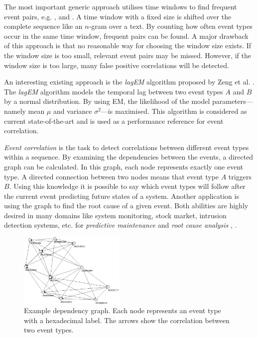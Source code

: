 \documentclass[conference]{IEEEtran}
\theoremstyle{examplestyle}
\begin{document}
The most important generic approach utilises time windows to find frequent event pairs, e.g. \cite{Jakobson1993}, \cite{Mannila1997} and \cite{Bouandas2007}. A time window with a fixed size is shifted over the complete sequence like an \(n\)-gram over a text. By counting how often event types occur in the same time window, frequent pairs can be found. A major drawback of this approach is that no reasonable way for choosing the window size exists. If the window size is too small, relevant event pairs may be missed. However, if the window size is too large, many false positive correlations will be detected.


An interesting existing approach is the \textit{lagEM} algorithm proposed by Zeng et al. \cite{Zeng2015}. The \textit{lagEM} algorithm models the temporal lag between two event types \(A\) and \(B\) by a normal distribution. By using \ac{EM}, the likelihood of the model parameters---namely mean \(\mu\) and variance \(\sigma^2\)---is maximised. This algorithm is considered as current state-of-the-art and is used as a performance reference for event correlation.




\textit{Event correlation} is the task to detect correlations between different event types within a sequence. By examining the dependencies between the events, a directed graph can be calculated. In this graph, each node represents exactly one event type. A directed connection between two nodes means that event type \(A\) triggers \(B\). Using this knowledge it is possible to say which event types will follow after the current event predicting future states of a system. Another application is using the graph to find the root cause of a given event. Both abilities are highly desired in many domains like system monitoring, stock market, intrusion detection systems, etc. for \textit{predictive maintenance} and \textit{root cause analysis} \cite{Zeng2015}, \cite{Benferhat2008}.


\begin{figure}[!htb]
	\centering
	\includegraphics[width=0.45\textwidth]{images/dependency-graph}
	\caption{Example dependency graph. Each node represents an event type with a hexadecimal label. The arrows show the correlation between two event types.}
	\label{fig:exampleDependencyGraph}
\end{figure}
\end{document}
